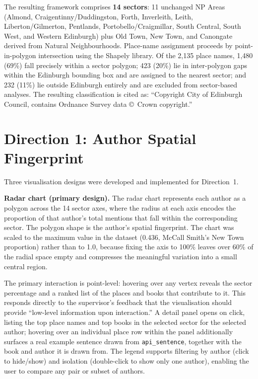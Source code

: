 \documentclass[logo,msc]{infthesis}
\begin{document}
The resulting framework comprises \textbf{14 sectors}: 11 unchanged NP Areas (Almond, Craigentinny/Duddingston, Forth, Inverleith, Leith, Liberton/Gilmerton, Pentlands, Portobello/Craigmillar, South Central, South West, and Western Edinburgh) plus Old Town, New Town, and Canongate derived from Natural Neighbourhoods. Place-name assignment proceeds by point-in-polygon intersection using the Shapely library. Of the 2,135 place names, 1,480 (69\%) fall precisely within a sector polygon; 423 (20\%) lie in inter-polygon gaps within the Edinburgh bounding box and are assigned to the nearest sector; and 232 (11\%) lie outside Edinburgh entirely and are excluded from sector-based analyses. The resulting classification is cited as: ``Copyright City of Edinburgh Council, contains Ordnance Survey data \copyright\ Crown copyright.''
 
\section{Direction 1: Author Spatial Fingerprint}
 
Three visualisation designs were developed and implemented for Direction~1.
 
\textbf{Radar chart (primary design).} The radar chart represents each author as a polygon across the 14 sector axes, where the radius at each axis encodes the proportion of that author's total mentions that fall within the corresponding sector. The polygon shape is the author's spatial fingerprint. The chart was scaled to the maximum value in the dataset (0.436, McCall Smith's New Town proportion) rather than to 1.0, because fixing the axis to 100\% leaves over 60\% of the radial space empty and compresses the meaningful variation into a small central region.
 
The primary interaction is point-level: hovering over any vertex reveals the sector percentage and a ranked list of the places and books that contribute to it. This responds directly to the supervisor's feedback that the visualisation should provide ``low-level information upon interaction.'' A detail panel opens on click, listing the top place names and top books in the selected sector for the selected author; hovering over an individual place row within the panel additionally surfaces a real example sentence drawn from \texttt{api\_sentence}, together with the book and author it is drawn from. The legend supports filtering by author (click to hide/show) and isolation (double-click to show only one author), enabling the user to compare any pair or subset of authors.
 
\end{document}

